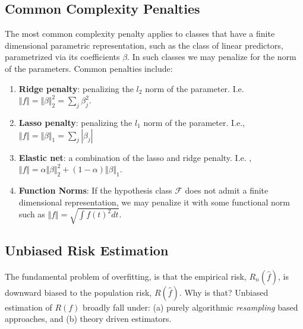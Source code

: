 \documentclass[]{book}
\providecommand{\tightlist}{%
  \setlength{\itemsep}{0pt}\setlength{\parskip}{0pt}}
\theoremstyle{definition}
\theoremstyle{definition}
\theoremstyle{definition}
\theoremstyle{remark}
\begin{document}
\subsection{Common Complexity
Penalties}\label{common-complexity-penalties}

The most common complexity penalty applies to classes that have a finite
dimensional parametric representation, such as the class of linear
predictors, parametrized via its coefficients \(\beta\). In such classes
we may penalize for the norm of the parameters. Common penalties
include:

\begin{enumerate}
\def\labelenumi{\arabic{enumi}.}
\tightlist
\item
  \textbf{Ridge penalty}: penalizing the \(l_2\) norm of the parameter.
  I.e. \(\Vert f \Vert=\Vert \beta \Vert_2^2=\sum_j \beta_j^2\).
\item
  \textbf{Lasso penalty}: penalizing the \(l_1\) norm of the parameter.
  I.e., \(\Vert f \Vert=\Vert \beta \Vert_1=\sum_j |\beta_j|\)
\item
  \textbf{Elastic net}: a combination of the lasso and ridge penalty.
  I.e.
  ,\(\Vert f \Vert= \alpha \Vert \beta \Vert_2^2 + (1-\alpha) \Vert \beta \Vert_1\).
\item
  \textbf{Function Norms}: If the hypothesis class \(\mathcal{F}\) does
  not admit a finite dimensional representation, we may penalize it with
  some functional norm such as \(\Vert f \Vert=\sqrt{\int f(t)^2 dt}\).
\end{enumerate}

\subsection{Unbiased Risk Estimation}\label{unbiased-risk-estimation}

The fundamental problem of overfitting, is that the empirical risk,
\(R_n(\hat f)\), is downward biased to the population risk,
\(R(\hat f)\). Why is that? Unbiased estimation of \(R(f)\) broadly fall
under: (a) purely algorithmic \emph{resampling} based approaches, and
(b) theory driven estimators.
\end{document}
